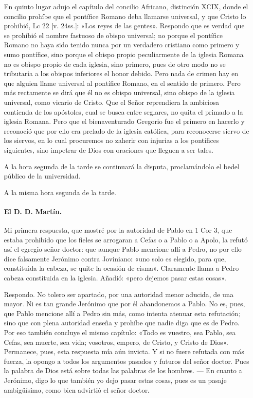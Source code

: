 \marginpar{\small[263]} En quinto lugar adujo el capítulo del concilio Africano, distinción XCIX, donde el concilio prohíbe que el pontífice Romano deba llamarse universal, y que Cristo lo prohibió, Lc 22 [v. 24ss.]: «Los reyes de las gentes». Respondo que es verdad que se prohibió el nombre fastuoso de obispo universal; no porque el pontífice Romano no haya sido tenido nunca por un verdadero cristiano como primero y sumo pontífice, sino porque el obispo propio peculiarmente de la iglesia Romana no es obispo propio de cada iglesia, sino primero, pues de otro modo no se tributaría a los obispos inferiores el honor debido. Pero nada de crimen hay en que alguien llame universal al pontífice Romano, en el sentido de primero. Pero más rectamente se dirá que él no es obispo universal, sino obispo de la iglesia universal, como vicario de Cristo. Que el Señor reprendiera la ambiciosa contienda de los apóstoles, cual se busca entre seglares, no quita el primado a la iglesia Romana. Pero que el bienaventurado Gregorio fue el primero en hacerlo y reconoció que por ello era prelado de la iglesia católica, para reconocerse siervo de los siervos, en lo cual procuremos no zaherir con injurias a los pontífices siguientes, sino impetrar de Dios con oraciones que lleguen a ser tales.

A la hora segunda de la tarde se continuará la disputa, proclamándolo el bedel público de la universidad.

A la misma hora segunda de la tarde.

\paragraph*{El D. D. Martín.}

Mi primera respuesta, que mostré por la autoridad de Pablo en 1 Cor 3, que estaba prohibido que los fieles se arrogaran a Cefas o a Pablo o a Apolo, la refutó así el egregio señor doctor: que aunque Pablo mencione allí a Pedro, no por ello dice falsamente Jerónimo contra Joviniano: «uno solo es elegido, para que, constituida la cabeza, se quite la ocasión de cisma». Claramente llama a Pedro cabeza constituida en la iglesia. Añadió: «pero dejemos pasar estas cosas».

Respondo. No tolero ser apartado, por una autoridad menor aducida, de una mayor. Ni es tan grande Jerónimo que por él abandonemos a Pablo. No es, pues, que Pablo mencione allí a Pedro sin más, como intenta atenuar esta refutación; sino que con plena autoridad enseña y prohíbe que nadie diga que es de Pedro. Por eso también concluye el mismo capítulo: «Todo es vuestro, sea Pablo, sea Cefas, sea muerte, sea vida; vosotros, empero, de Cristo, y Cristo de Dios». Permanece, pues, esta respuesta mía aún invicta. Y si no fuere refutada con más fuerza, la opongo a todos los argumentos pasados y futuros del señor doctor. Pues la palabra de Dios está sobre todas las palabras de los hombres. — En cuanto a Jerónimo, digo lo que también yo dejo pasar estas cosas, pues es un pasaje ambigüísimo, como bien advirtió el señor doctor.

